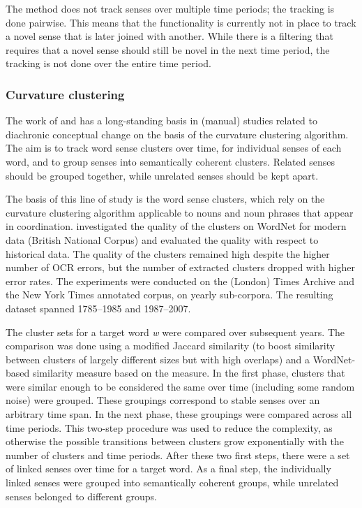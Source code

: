 \documentclass[output=paper]{langsci/langscibook}
\begin{document}
The method does not track senses over multiple time periods; the tracking is done pairwise. This means that the functionality is currently not in place to track a novel sense that is later joined with another. 
While there is a filtering that requires that a novel sense should still be novel in the next time period, the tracking is not done over the entire time period. 


\subsubsection{Curvature clustering}
The work of \citet{tahmasebi2013models} and \citet{tahmasebi-ranlp17} has a long-standing basis in (manual) studies related to  diachronic conceptual change on the basis of the curvature clustering algorithm. The aim is to track word sense clusters over time, for individual senses of each word, and to group senses into semantically coherent clusters. Related senses should be grouped together, while unrelated senses should be kept apart. 

The basis of this line of study is the word sense clusters, which rely on the curvature clustering algorithm \citep{dorow04usingcurvature} applicable to nouns and noun phrases that appear in coordination.
\citet{dorow04usingcurvature} investigated the quality of the clusters on WordNet for modern data (British National Corpus) and \citet{tahmasebi2013applicability} evaluated the quality with respect to historical data. The quality of the clusters remained high despite the higher number of OCR errors, but the number of extracted clusters dropped with higher error rates. 
%
The experiments were conducted on the (London) Times Archive and the New York Times annotated corpus, on yearly sub-corpora. The resulting dataset spanned 1785--1985 and 1987--2007.

The cluster sets for a target word \textit{w} were compared over subsequent years. The comparison was done using a modified Jaccard similarity (to boost similarity between clusters of largely different sizes but with high overlaps) and a WordNet-based similarity measure based on the \citet{lin_1998} measure. 
In the first phase, clusters that were similar enough to be considered the same over time (including some random noise) were grouped. These groupings correspond to stable senses over an arbitrary time span. In the next phase, these groupings were compared across all time periods. This two-step procedure was used to reduce the complexity, as otherwise the possible transitions between clusters grow exponentially with the number of clusters and time periods. 
After these two first steps, there were a set of linked senses over time for a target word. As a final step, the individually linked senses were grouped into semantically coherent groups, while unrelated senses belonged to different groups. 
\end{document}
